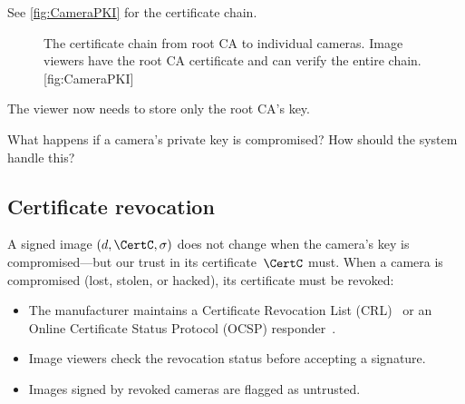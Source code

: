See \cref{fig:CameraPKI} for the certificate chain.

\begin{figure}
  \begin{sidecaption}{%
    The certificate chain from root CA to individual cameras.
    Image viewers have the root CA certificate and can verify the
    entire chain.
  }[fig:CameraPKI]
  \centering
  \end{sidecaption}
\end{figure}

The viewer now needs to store only the root \ac{CA}'s key.

\begin{exercise}
  What happens if a camera's private key is compromised?
  How should the system handle this?
\end{exercise}

\subsection{Certificate revocation}

A signed image \((d, \CertC, \sigma)\) does not change when the camera's
key is compromised---but our trust in its certificate~\(\CertC\) must.
When a camera is compromised (lost, stolen, or hacked), its certificate
must be revoked:
\begin{itemize}
  \item The manufacturer maintains a Certificate Revocation List
    (CRL)~\autocite{RFC5280} or an Online Certificate Status Protocol
    (OCSP) responder~\autocite{RFC6960}.
  \item Image viewers check the revocation status before accepting a
    signature.
  \item Images signed by revoked cameras are flagged as untrusted.
\end{itemize}

